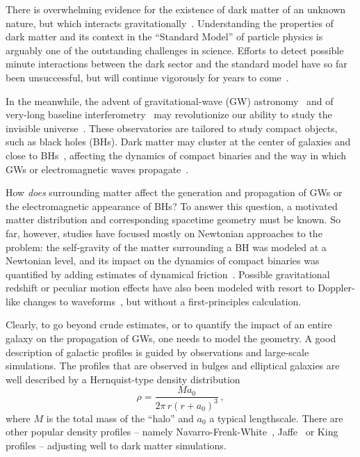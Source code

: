\documentclass[twocolumn,preprintnumbers,nofootinbib,prd,superscriptaddress,aps]{revtex4-1}
\def\be{\begin{equation}}
\def\ee{\end{equation}}
\def\be{\begin{equation}}
\def\ee{\end{equation}}
\begin{document}
There is overwhelming evidence for the existence of dark matter of an unknown nature, but which interacts gravitationally~\cite{Freese:2008cz,Navarro:1995iw,Clowe:2006eq,Bertone:2004pz}.
Understanding the properties of dark matter and its context in the ``Standard Model'' of particle physics is arguably one of the outstanding challenges in science.
Efforts to detect possible minute interactions between the dark sector and the standard model have so far been unsuccessful, but will continue vigorously for years to come~\cite{Kahlhoefer:2017dnp,PerezdelosHeros:2020qyt}. 


In the meanwhile, the advent of gravitational-wave (GW) astronomy~\cite{LIGOScientific:2016aoc,Abbott:2020niy} and of very-long baseline interferometry~\cite{EventHorizonTelescope:2019dse,GRAVITY:2020gka} may revolutionize our ability to study the invisible universe~\cite{Barack:2018yly,Cardoso:2019rvt,Bertone:2018krk,Bar:2019pnz,Brito:2015oca}. These observatories are tailored to study compact objects, such as black holes (BHs). Dark matter may cluster at the center of galaxies and close to BHs~\cite{Sadeghian:2013laa}, affecting the dynamics of compact binaries and the way in which GWs or electromagnetic waves propagate~\cite{Eda:2013gg,Macedo:2013qea,Barausse:2014tra,Barack:2018yly,Baibhav:2019rsa,Seoane:2021kkk}. 


How {\it does} surrounding matter affect the generation and propagation of GWs or the electromagnetic appearance of BHs?
To answer this question, a motivated matter distribution and corresponding spacetime geometry must be known.
So far, however, studies have focused mostly on Newtonian approaches to the problem: the self-gravity of the matter surrounding a BH was modeled at a Newtonian level,
and its impact on the dynamics of compact binaries was quantified by adding estimates of dynamical friction~\cite{Eda:2013gg,Macedo:2013qea,Barausse:2014tra,Cardoso:2019rou,Kavanagh:2020cfn}.
Possible gravitational redshift or peculiar motion effects have also been modeled with resort to Doppler-like changes to waveforms~\cite{Tamanini:2019usx}, but without a first-principles calculation.

Clearly, to go beyond crude estimates, or to quantify the impact of an entire galaxy on the propagation of GWs, one needs to model the geometry.
A good description of galactic profiles is guided by observations and large-scale simulations.
The profiles that are observed in bulges and elliptical galaxies are well described by a Hernquist-type density distribution~\cite{1990ApJ...356..359H}
%
\be
\rho=\frac{Ma_0}{2\pi\,r(r + a_0)^3}\,,\label{eq_rho:hernquist}
\ee
%
where $M$ is the total mass of the ``halo'' and $a_0$ a typical lengthscale. There are other popular density profiles -- namely Navarro-Frenk-White~\cite{Navarro:1995iw}, Jaffe~\cite{1983MNRAS.202..995J} or King~\cite{1962AJ.....67..471K} profiles -- adjusting well to dark matter simulations.
\end{document}
